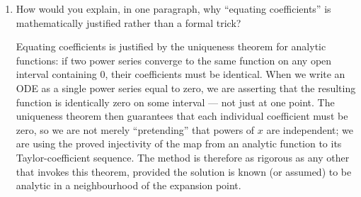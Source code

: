 \documentclass{self-check}
\begin{document}
\begin{enumerate}[leftmargin=*, itemsep=8pt]
\begin{answer}
    \end{answer}
  \item How would you explain, in one paragraph, why ``equating coefficients'' is mathematically justified rather than a formal trick?
    \begin{answer}
      Equating coefficients is justified by the uniqueness theorem for analytic functions: if two power series converge to the same function on any open interval containing \(0\), their coefficients must be identical. When we write an ODE as a single power series equal to zero, we are asserting that the resulting function is identically zero on some interval --- not just at one point. The uniqueness theorem then guarantees that each individual coefficient must be zero, so we are not merely ``pretending'' that powers of \(x\) are independent; we are using the proved injectivity of the map from an analytic function to its Taylor-coefficient sequence. The method is therefore as rigorous as any other that invokes this theorem, provided the solution is known (or assumed) to be analytic in a neighbourhood of the expansion point.
    \end{answer}
\end{enumerate}
\end{document}
